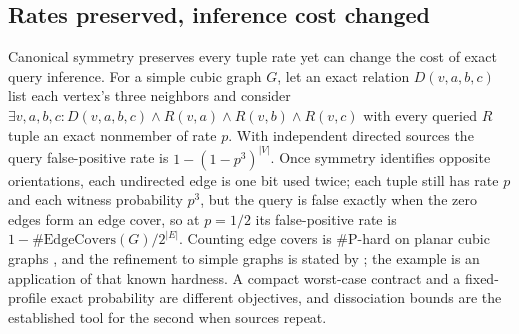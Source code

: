 \subsection*{Rates preserved, inference cost changed}

Canonical symmetry preserves every tuple rate yet can change the cost of exact
query inference. For a simple cubic graph $G$, let an exact relation $D(v, a, b,
c)$ list each vertex's three neighbors and consider $\exists v, a, b, c : D(v, a,
b, c) \land R(v, a) \land R(v, b) \land R(v, c)$ with every queried $R$ tuple an
exact nonmember of rate $p$. With independent directed sources the query
false-positive rate is $1 - (1 - p^3)^{|V|}$. Once symmetry identifies opposite
orientations, each undirected edge is one bit used twice; each tuple still has
rate $p$ and each witness probability $p^3$, but the query is false exactly when
the zero edges form an edge cover, so at $p = 1/2$ its false-positive rate is $1 -
\#\mathrm{EdgeCovers}(G)/2^{|E|}$. Counting edge covers is \#P-hard on planar
cubic graphs \parencite{cai-lu-xia-2012}, and the refinement to simple graphs is
stated by \textcite{amarilli-monet-2022}; the example is an application of that
known hardness. A compact worst-case contract and a fixed-profile exact probability are
different objectives, and dissociation bounds
\parencite{gatterbauer-suciu-2014} are the established tool for the second when
sources repeat.
